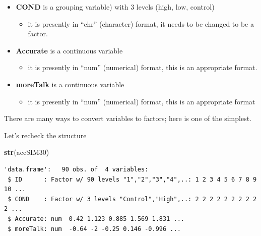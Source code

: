 \documentclass[
  11pt,
]{book}
\newenvironment{Shaded}{\begin{snugshade}}{\end{snugshade}}
\newcommand{\CommentTok}[1]{\textcolor[rgb]{0.37,0.37,0.37}{\textit{#1}}}
\newcommand{\FunctionTok}[1]{\textcolor[rgb]{0.27,0.27,0.27}{\textbf{#1}}}
\newcommand{\NormalTok}[1]{#1}
\newcommand{\OtherTok}[1]{\textcolor[rgb]{0.37,0.37,0.37}{#1}}
\newcommand{\SpecialCharTok}[1]{\textcolor[rgb]{0.43,0.43,0.43}{\textbf{#1}}}
\providecommand{\tightlist}{%
  \setlength{\itemsep}{0pt}\setlength{\parskip}{0pt}}
\begin{document}
\begin{itemize}
\tightlist
\item
  \textbf{COND} is a grouping variable) with 3 levels (high, low, control)

  \begin{itemize}
  \tightlist
  \item
    it is presently in ``chr'' (character) format, it needs to be changed to be a factor.
  \end{itemize}
\item
  \textbf{Accurate} is a continuous variable

  \begin{itemize}
  \tightlist
  \item
    it is presently in ``num'' (numerical) format, this is an appropriate format.
  \end{itemize}
\item
  \textbf{moreTalk} is a continuous variable

  \begin{itemize}
  \tightlist
  \item
    it is presently in ``num'' (numerical) format, this is an appropriate format
  \end{itemize}
\end{itemize}

There are many ways to convert variables to factors; here is one of the simplest.

\begin{Shaded}
\end{Shaded}

Let's recheck the structure

\begin{Shaded}
\begin{Highlighting}[]
\FunctionTok{str}\NormalTok{(accSIM30)}
\end{Highlighting}
\end{Shaded}

\begin{verbatim}
'data.frame':   90 obs. of  4 variables:
 $ ID      : Factor w/ 90 levels "1","2","3","4",..: 1 2 3 4 5 6 7 8 9 10 ...
 $ COND    : Factor w/ 3 levels "Control","High",..: 2 2 2 2 2 2 2 2 2 2 ...
 $ Accurate: num  0.42 1.123 0.885 1.569 1.831 ...
 $ moreTalk: num  -0.64 -2 -0.25 0.146 -0.996 ...
\end{verbatim}
\end{document}
